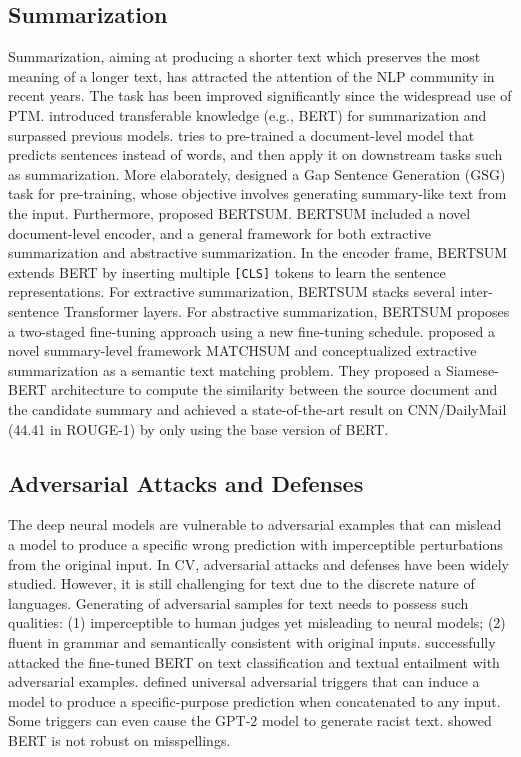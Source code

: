 \documentclass[fleqn]{SCYE-arxiv}
\begin{document}
\begin{multicols}{2}
\subsection{Summarization}

Summarization, aiming at producing a shorter text which preserves the most meaning of a longer text, has attracted the attention of the NLP community in recent years. The task has been improved significantly since the widespread use of PTM. \citet{zhong-etal-2019-searching} introduced transferable knowledge (e.g., BERT) for summarization and surpassed previous models. \citet{zhang-etal-2019-hibert} tries to pre-trained a document-level model that predicts sentences instead of words, and then apply it on downstream tasks such as summarization. More elaborately, \citet{zhang2019pegasus} designed a Gap Sentence Generation (GSG) task for pre-training, whose objective involves generating summary-like text from the input. Furthermore, \citet{liu2019text} proposed BERTSUM. BERTSUM included a novel document-level encoder, and a general framework for both extractive summarization and abstractive summarization. In the encoder frame, BERTSUM extends BERT by inserting multiple \texttt{[CLS]} tokens to learn the sentence representations. For extractive summarization, BERTSUM stacks several inter-sentence Transformer layers. For abstractive summarization, BERTSUM proposes a two-staged fine-tuning approach using a new fine-tuning schedule. \citet{zhong2020extractive} proposed a novel summary-level framework MATCHSUM and conceptualized extractive summarization as a semantic text
matching problem. They proposed a Siamese-BERT architecture to compute the similarity between the source document and the candidate summary and achieved a state-of-the-art result on CNN/DailyMail (44.41 in ROUGE-1) by only using the base version of BERT.

\subsection{Adversarial Attacks and Defenses}
\label{sec:attacks}

The deep neural models are vulnerable to adversarial examples that can mislead a model to produce a specific wrong prediction with imperceptible perturbations from the original input.
In CV, adversarial attacks and defenses have been widely studied. However, it is still challenging for text due to the discrete nature of languages.
Generating of adversarial samples for text needs to possess such qualities: (1) imperceptible to human judges yet misleading to neural models; (2) fluent in grammar and semantically consistent with original inputs.
\citet{jin2019bert} successfully attacked the fine-tuned BERT on text
classification and textual entailment with adversarial examples.
\citet{wallace2019universal} defined universal adversarial triggers that can induce a model to produce a specific-purpose prediction when concatenated to any input. Some triggers can even cause the GPT-2 model to generate racist text.
\citet{sun2020adv} showed BERT is not robust on misspellings.


\end{multicols}
\end{document}
